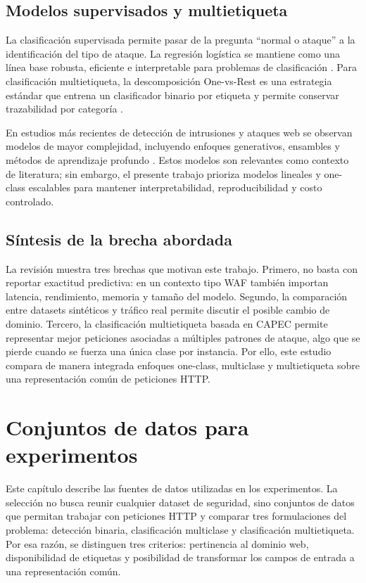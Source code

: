 \documentclass[12pt,oneside]{report}
\begin{document}
\section{Modelos supervisados y multietiqueta}
La clasificación supervisada permite pasar de la pregunta ``normal o ataque'' a la identificación del tipo de ataque. La regresión logística se mantiene como una línea base robusta, eficiente e interpretable para problemas de clasificación \cite{islr_logreg,sklearn_logreg}. Para clasificación multietiqueta, la descomposición One-vs-Rest es una estrategia estándar que entrena un clasificador binario por etiqueta y permite conservar trazabilidad por categoría \cite{rifkin_ova,tsoumakas_multilabel_overview}.

En estudios más recientes de detección de intrusiones y ataques web se observan modelos de mayor complejidad, incluyendo enfoques generativos, ensambles y métodos de aprendizaje profundo \cite{fang_2024,zhou_2024}. Estos modelos son relevantes como contexto de literatura; sin embargo, el presente trabajo prioriza modelos lineales y one-class escalables para mantener interpretabilidad, reproducibilidad y costo controlado.

\section{Síntesis de la brecha abordada}
La revisión muestra tres brechas que motivan este trabajo. Primero, no basta con reportar exactitud predictiva: en un contexto tipo WAF también importan latencia, rendimiento, memoria y tamaño del modelo. Segundo, la comparación entre datasets sintéticos y tráfico real permite discutir el posible cambio de dominio. Tercero, la clasificación multietiqueta basada en CAPEC permite representar mejor peticiones asociadas a múltiples patrones de ataque, algo que se pierde cuando se fuerza una única clase por instancia. Por ello, este estudio compara de manera integrada enfoques one-class, multiclase y multietiqueta sobre una representación común de peticiones HTTP.

\chapter{Conjuntos de datos para experimentos}

Este capítulo describe las fuentes de datos utilizadas en los experimentos. La selección no busca reunir cualquier dataset de seguridad, sino conjuntos de datos que permitan trabajar con peticiones HTTP y comparar tres formulaciones del problema: detección binaria, clasificación multiclase y clasificación multietiqueta. Por esa razón, se distinguen tres criterios: pertinencia al dominio web, disponibilidad de etiquetas y posibilidad de transformar los campos de entrada a una representación común.
\end{document}
